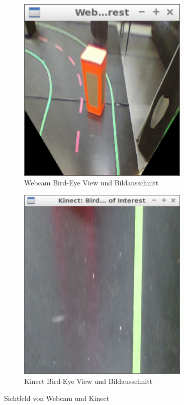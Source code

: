 \begin{figure}[ht]
	\centering
	\begin{subfigure}{0.45\textwidth}
		\centering
		\includegraphics[width=0.9\textwidth]{images/Webcam_BirdEye_ROI.png}
		\caption{Webcam Bird-Eye View und Bildausschnitt}
	\end{subfigure}
	\begin{subfigure}{0.45\textwidth}
		\centering
		\includegraphics[width=0.9\textwidth]{images/Kinect_BirdEye_ROI.png}
		\caption{Kinect Bird-Eye View und Bildausschnitt}
	\end{subfigure}
	\caption{Sichtfeld von Webcam und Kinect}
\end{figure}

